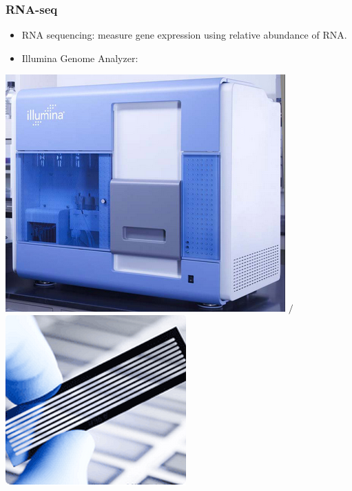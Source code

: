 \documentclass[handout]{beamer}
\numberwithin{equation}{section}
\begin{document}
\begin{frame}
\frametitle{RNA-seq}

\begin{itemize}
\item RNA sequencing: measure gene expression using relative abundance of RNA.
\item Illumina Genome Analyzer:
\end{itemize}

\begin{center}
\includegraphics[scale=.35]{fig/illumina.png} $/ $\includegraphics[scale=.45]{fig/flowcell.png}
\end{center}
\end{frame}
\end{document}
